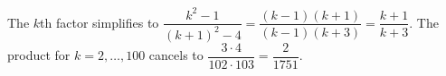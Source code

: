 The $k$th factor simplifies to $\dfrac{k^2-1}{(k+1)^2-4}=\dfrac{(k-1)(k+1)}{(k-1)(k+3)}=\dfrac{k+1}{k+3}$. The product for $k=2,\ldots,100$ cancels to $\dfrac{3\cdot4}{102\cdot103}=\boxed{\dfrac{2}{1751}}$.
